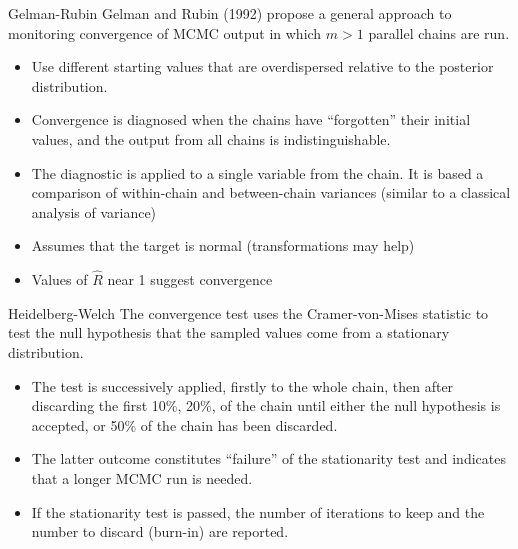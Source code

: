 \documentclass[dvips]{beamer}
\begin{document}
\begin{slide}{Gelman-Rubin}
  Gelman and Rubin (1992) propose a general approach to monitoring convergence of MCMC output
in which $m > 1$ parallel chains are run.

\begin{itemize}
\item Use different starting values that are overdispersed relative to the
posterior distribution.
\item  Convergence is diagnosed when the chains have ``forgotten'' their initial values,
and the output from all chains is indistinguishable.
\item  The diagnostic is applied
to a single variable from the chain. It is based a comparison of within-chain and between-chain
variances (similar to a classical analysis of variance) 
\item Assumes that the target is normal (transformations may help)
\item Values of $\hat{R}$ near 1 suggest convergence
\end{itemize}

\end{slide}
\begin{slide}{Heidelberg-Welch}
The convergence test uses the Cramer-von-Mises statistic to test the null hypothesis that the sampled
values come from a stationary distribution. 
\begin{itemize}
\item 
The test is successively applied, firstly to the whole
chain, then after discarding the first 10\%, 20\%,  of the chain until either the null hypothesis is
accepted, or 50\% of the chain has been discarded. 
\item The latter outcome constitutes ``failure'' of the
stationarity test and indicates that a longer MCMC run is needed.
\item  If the stationarity test is passed,
the number of iterations to keep and the number to discard (burn-in) are reported.
\end{itemize}

\end{slide}
\end{document}
